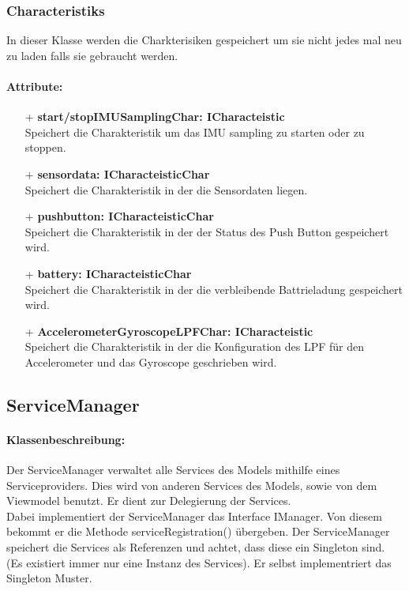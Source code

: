 \documentclass[a4paper,12pt]{article}
\begin{document}
\subsubsection{Characteristiks}
In dieser Klasse werden die Charkterisiken gespeichert um sie nicht jedes mal neu zu laden falls sie gebraucht werden.

\paragraph{Attribute:}
\begin{itemize}
	\item[+] \textbf{start/stopIMUSamplingChar: ICharacteistic}\\Speichert die Charakteristik um das IMU sampling zu starten oder zu stoppen.
	\item[+] \textbf{sensordata: ICharacteisticChar}\\Speichert die Charakteristik in der die Sensordaten liegen.
	\item[+] \textbf{pushbutton: ICharacteisticChar}\\Speichert die Charakteristik in der der Status des Push Button gespeichert wird.
	\item[+] \textbf{battery: ICharacteisticChar}\\Speichert die Charakteristik in der die verbleibende Battrieladung gespeichert wird.
	\item[+] \textbf{AccelerometerGyroscopeLPFChar: ICharacteistic}\\Speichert die Charakteristik in der die Konfiguration des LPF für den Accelerometer und das Gyroscope geschrieben wird.
\end{itemize}


\subsection{ServiceManager}
	\paragraph{Klassenbeschreibung:}
	Der ServiceManager verwaltet alle Services des Models mithilfe eines Serviceproviders. Dies wird von anderen Services des Models, sowie von dem Viewmodel benutzt. Er dient zur Delegierung der Services.\\ 
	Dabei implementiert der ServiceManager das Interface IManager.
	Von diesem bekommt er die Methode serviceRegistration() übergeben.
	Der ServiceManager speichert die Services als Referenzen und achtet, dass diese ein Singleton sind. (Es existiert immer nur eine Instanz des Services).
	Er selbst implementriert das Singleton Muster.
	
\end{document}
